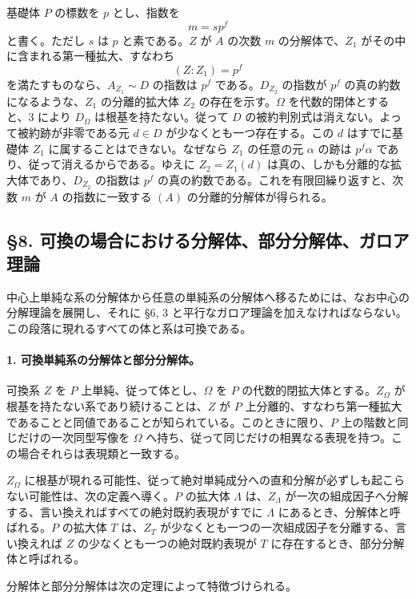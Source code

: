 基礎体 \(P\) の標数を \(p\) とし、指数を
\[
        m=s p^f
\]
と書く。ただし \(s\) は \(p\) と素である。\(Z\) が \(A\) の次数 \(m\) の分解体で、\(Z_1\) がその中に含まれる第一種拡大、すなわち
\[
        (Z:Z_1)=p^f
\]
を満たすものなら、\(A_{Z_1}\sim D\) の指数は \(p^f\) である。\(D_{Z_2}\) の指数が \(p^f\) の真の約数になるような、\(Z_1\) の分離的拡大体 \(Z_2\) の存在を示す。\(\Omega\) を代数的閉体とすると、3 により \(D_\Omega\) は根基を持たない。従って \(D\) の被約判別式は消えない。よって被約跡が非零である元 \(d\in D\) が少なくとも一つ存在する。この \(d\) はすでに基礎体 \(Z_1\) に属することはできない。なぜなら \(Z_1\) の任意の元 \(\alpha\) の跡は \(p^f\alpha\) であり、従って消えるからである。ゆえに \(Z_2=Z_1(d)\) は真の、しかも分離的な拡大体であり、\(D_{Z_2}\) の指数は \(p^f\) の真の約数である。これを有限回繰り返すと、次数 \(m\) が \(A\) の指数に一致する \((A)\) の分離的分解体が得られる。

\subsection*{§8. 可換の場合における分解体、部分分解体、ガロア理論}

中心上単純な系の分解体から任意の単純系の分解体へ移るためには、なお中心の分解理論を展開し、それに §6, 3 と平行なガロア理論を加えなければならない。この段落に現れるすべての体と系は可換である。

\paragraph{1. 可換単純系の分解体と部分分解体。}
可換系 \(Z\) を \(P\) 上単純、従って体とし、\(\Omega\) を \(P\) の代数的閉拡大体とする。\(Z_\Omega\) が根基を持たない系であり続けることは、\(Z\) が \(P\) 上分離的、すなわち第一種拡大であることと同値であることが知られている。このときに限り、\(P\) 上の階数と同じだけの一次同型写像を \(\Omega\) へ持ち、従って同じだけの相異なる表現を持つ。この場合それらは表現類と一致する。

\(Z_\Omega\) に根基が現れる可能性、従って絶対単純成分への直和分解が必ずしも起こらない可能性は、次の定義へ導く。\(P\) の拡大体 \(\Lambda\) は、\(Z_\Lambda\) が一次の組成因子へ分解する、言い換えればすべての絶対既約表現がすでに \(\Lambda\) にあるとき、分解体と呼ばれる。\(P\) の拡大体 \(T\) は、\(Z_T\) が少なくとも一つの一次組成因子を分離する、言い換えれば \(Z\) の少なくとも一つの絶対既約表現が \(T\) に存在するとき、部分分解体と呼ばれる。

分解体と部分分解体は次の定理によって特徴づけられる。

